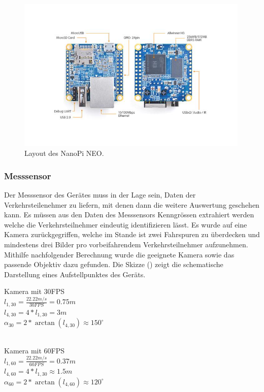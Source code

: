 \begin{figure}[H]
  \centering
  \includegraphics[width=0.99\textwidth]{Hardware/NanoPi_Neo.jpg} 
  \caption{Layout des NanoPi NEO. \cite{NanoPiNeo}}
  \label{bLayout}
\end{figure}

\subsubsection{Messsensor}
Der Messsensor des Gerätes muss in der Lage sein, Daten der Verkehrsteilenehmer zu liefern, mit denen dann die weitere Auswertung geschehen kann. Es müssen aus den Daten des Messsensors Kenngrössen extrahiert werden welche die Verkehrsteilnehmer eindeutig identifizieren lässt. Es wurde auf eine Kamera zurückgegriffen, welche im Stande ist zwei Fahrspuren zu überdecken und mindestens drei Bilder pro vorbeifahrendem Verkehrsteilnehmer aufzunehmen. \\
Mithilfe nachfolgender Berechnung wurde die geeignete Kamera sowie das passende Objektiv dazu gefunden. Die Skizze () zeigt die schematische Darstellung eines Aufstellpunktes des Geräts.
\begin{citemize}

\item Kamera mit 30FPS \\
$l_{ 1,30 } = \frac{ 22.22 m/s }{ 30 FPS} = 0.75 m$ \\ 
$l_{ 4,30 } = 4 * l_{1,30} = 3 m$\\
$\alpha_{30} = 2* \arctan(l_{4,30 }) \approx 150^\circ$ \\\\


\item Kamera mit 60FPS \\
$l_{ 1,60 } = \frac{ 22.22 m/s }{ 60 FPS} = 0.37 m$ \\ 
$l_{ 4,60 } = 4 * l_{1,30} \approx 1.5 m$\\
$\alpha_{60} = 2* \arctan(l_{4,60 }) \approx 120^\circ$ \\\\
\end{citemize}

